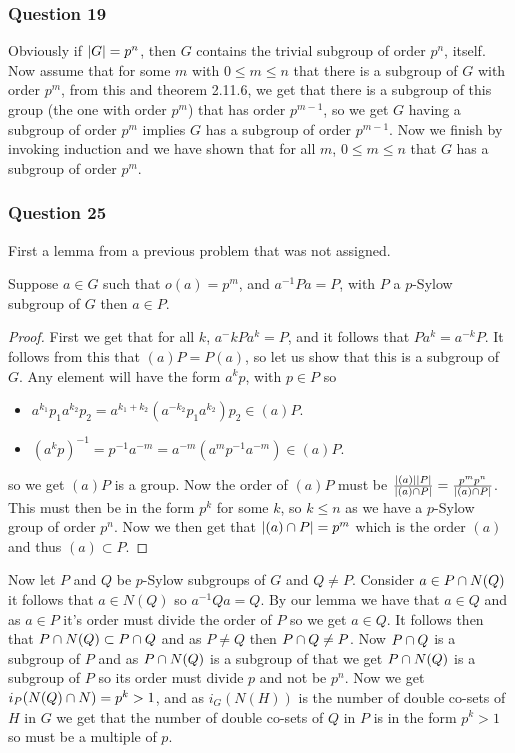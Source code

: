\documentclass{article}
\begin{document}
\subsubsection{Question 19}

Obviously if $\left| {G} \right| = p^n$, then $G$ contains the trivial subgroup of order $p^n$, itself. Now assume that for some $m$ with $0 \le m \le n$ that there is a subgroup of $G$ with order $p^m$, from this and theorem 2.11.6, we get that there is a subgroup of this group (the one with order $p^m$) that has order $p^{m-1}$, so we get $G$ having a subgroup of order $p^m$ implies $G$ has a subgroup of order $p^{m-1}$. Now we finish by invoking induction and we have shown that for all $m$, $0\le m \le n$ that $G$ has a subgroup of order $p^m$.

\subsubsection{Question 25}
First a lemma from a previous problem that was not assigned.
\begin{lemma}\label{Q25}
	Suppose $a \in G$ such that $o(a) = p^m$, and $a^{-1}Pa = P$, with $P$ a $p$-Sylow subgroup of $G$ then $a\in P$.
\end{lemma}
\begin{proof}
	First we get that for all $k$, $a^-kPa^k = P$, and it follows that $Pa^k=a^{-k}P$. It follows from this that $(a)P=P(a)$, so let us show that this is a subgroup of $G$. Any element will have the form $a^kp$, with $p\in P$ so
	\begin{itemize}
		\item $a^{k_1}p_1a^{k_2}p_2 = a^{k_1+k_2}\left(a^{-k_2}p_1a^{k_2}\right)p_2 \in (a)P$.
		\item $\left(a^kp\right)^{-1}=p^{-1}a^{-m} = a^{-m}\left(a^mp^{-1}a^{-m}\right) \in (a)P$.
	\end{itemize}
	so we get $(a)P$ is a group. Now the order of $(a)P$ must be $\frac{\left| {(a)} \right|\left| {P} \right|}{\left| {(a)\cap P} \right|} = \frac{p^mp^n}{\left| {(a)\cap P} \right|}$. This must then be in the form $p^k$ for some $k$, so $k \le n$ as we have a $p$-Sylow group of order $p^n$. Now we then get that $\left| {(a)\cap P} \right| = p^m$ which is the order $(a)$ and thus $(a)\subset P$.
\end{proof}
Now let $P$ and $Q$ be $p$-Sylow subgroups of $G$ and $Q\not=P$. Consider $a\in P\cap N(Q)$ it follows that $a\in N(Q)$ so $a^{-1}Qa = Q$. By our lemma we have that $a \in Q$ and as $a \in P$ it's order must divide the order of $P$ so we get $a \in Q$. It follows then that $P\cap N(Q) \subset P\cap Q$ and as $P\not=Q$ then $P\cap Q \not=P$. Now $P\cap Q$ is a subgroup of $P$ and as $P\cap N(Q)$ is a subgroup of that we get $P\cap N(Q)$ is a subgroup of $P$ so its order must divide $p$ and not be $p^n$. Now we get $i_P(N(Q)\cap N) = p^k  > 1$, and as $i_G(N(H))$ is the number of double co-sets of $H$ in $G$ we get that the number of double co-sets of $Q$ in $P$ is in the form $p^k > 1$ so must be a multiple of $p$.
\end{document}

